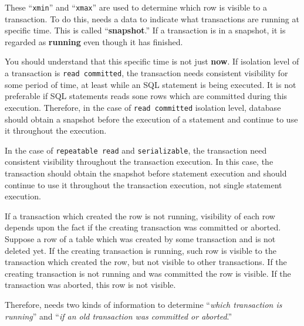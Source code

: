   These ``\texttt{xmin}'' and ``\texttt{xmax}'' are used to determine which row is visible
  to a transaction.
  To do this, \PG{} needs a data to indicate what transactions are running at specific time.
  This is called ``\textbf{snapshot}.''
  If a transaction is in a snapshot, it is regarded as \textbf{running} even though it has finished.

  You should understand that this specific time is not just \textbf{now}.
  If isolation level of a transaction is \texttt{read committed}, the transaction needs consistent
  visibility for some period of time, at least while an SQL statement is being executed.
  It is not preferable if SQL statements reads sone rows which are committed during this execution.
  Therefore, in the case of \texttt{read committed} isolation level, database should obtain a
  snapshot before the execution of a statement and continue to use it throughout the execution.


  In the case of \texttt{repeatable read} and \texttt{serializable}, the transaction need
  consistent visibility throughout the transaction execution.
  In this case, the transaction should obtain the snapshot before statement execution and should
  continue to use it throughout the transaction execution, not single statement execution.
  
  If a transaction which created the row is not running,
  visibility of each row depends upon the fact if the creating transaction was
  committed or aborted.
  Suppose a row of a table which was created by some transaction and is not deleted yet.
  If the creating transaction is running, such row is visible to the transaction
  which created the row, but not visible to other transactions.
  If the creating transaction is not running and was committed the row is visible.
  If the transaction was aborted, this row is not visible.
  
  Therefore, \PG{} needs two kinds of information to determine
  ``{\it which transaction is running}'' and
  ``{\it if an old transaction was committed or aborted}.''
  
